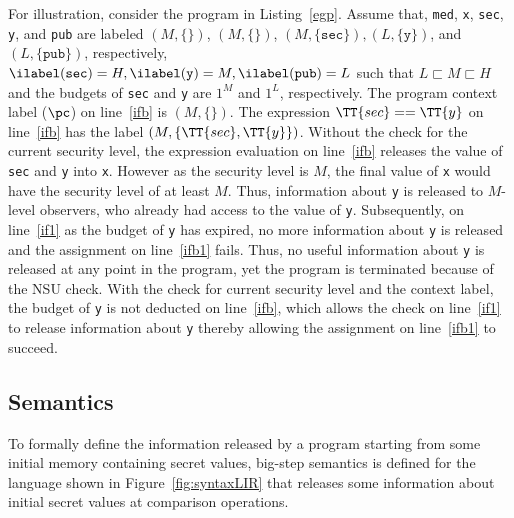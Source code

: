 For illustration, consider the program in Listing~\ref{egp}. Assume that,
\texttt{med}, \texttt{x}, \texttt{sec}, \texttt{y}, and \texttt{pub}
are labeled $(M, \{\})$, $(M, \{\})$, $(M, \{\texttt{sec}\}),
(L, \{\texttt{y}\})$, and $(L, \{\texttt{pub}\})$,
respectively, $\ilabel(\texttt{sec}) = H, \ilabel(\texttt{y}) = M,
\ilabel(\texttt{pub}) = L$ such that $L \sqsubset M \sqsubset H$ and the budgets
of \texttt{sec} and \texttt{y} are $1^M$ and $1^L$, respectively. The program
context label ($\pc$) on line~\ref{ifb} is $(M, \{\})$. The expression
$\TT{sec} == \TT{y}$ on line~\ref{ifb} has the label $(M, \{\TT{sec},
\TT{y} \})$. Without the check for the current security level, the
expression evaluation on line~\ref{ifb} releases the value of 
\texttt{sec} and \texttt{y} into \texttt{x}. However as the security
level is $M$, the final value of \texttt{x} would have the security
level of at least $M$. Thus, information about \texttt{y} is released
to $M$-level observers, who already had access to the value of
\texttt{y}. Subsequently, on line~\ref{if1} as the budget of
\texttt{y} has expired, no more information about \texttt{y} is
released and the assignment on line~\ref{ifb1} fails. Thus, no useful
information about \texttt{y} is released at any point in the program,
yet the program is terminated because of the NSU check. With the check
for current security level and the context label, the budget of
\texttt{y} is not deducted on line~\ref{ifb}, which allows the check
on line~\ref{if1} to release information about \texttt{y} 
thereby allowing the assignment on line~\ref{ifb1} to succeed.


\subsection{Semantics}
\label{sec:semantics}
To formally define the information released by a program starting from some
initial memory containing secret values, big-step semantics is defined
for the language shown in Figure~\ref{fig:syntaxLIR} that releases
some information about initial secret values at comparison operations.

